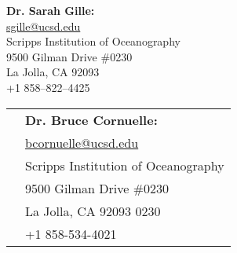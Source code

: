 \documentclass[10pt]{article}
\begin{document}
\begin{minipage}[ht]{0.48\textwidth}
\begin{flushleft}
\textbf{Dr. Sarah Gille:} \\
\vspace{.1cm}
\url{sgille@ucsd.edu}\\
\vspace{.2cm}
\small{Scripps Institution of Oceanography}\\
\small{9500 Gilman Drive \#0230} \\
\small{La Jolla, CA 92093} \\
\small{+1 858--822--4425} 
\end{flushleft}
\end{minipage}
\hfill
\begin{minipage}[ht]{0.48\textwidth}
\vspace{.1cm}
\begin{flushright}
\begin{tabular}{l  l }
& \textbf{Dr. Bruce Cornuelle:} \\[5pt]
& \url{bcornuelle@ucsd.edu} \\[5pt]
&\small{Scripps Institution of Oceanography}\\
&\small{9500 Gilman Drive \#0230} \\
&\small{La Jolla, CA 92093 0230} \\
&\small{+1 858-534-4021} 
\end{tabular}
\end{flushright}
\end{minipage}
\end{document}

